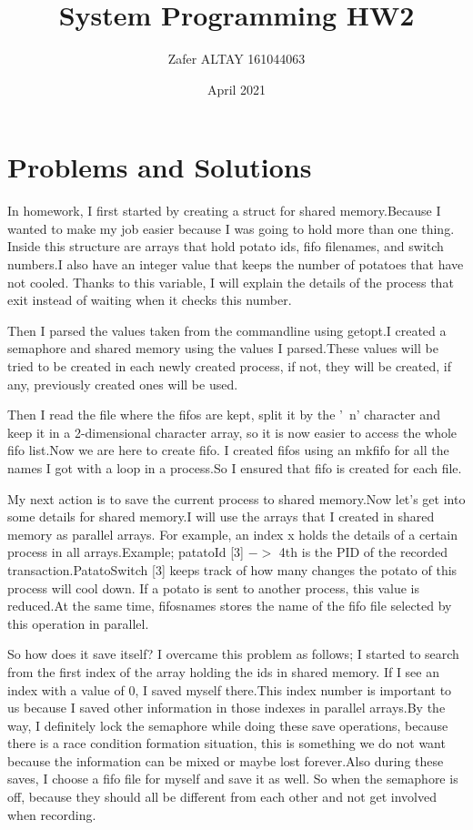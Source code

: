 \documentclass{article}
\title{System Programming HW2}
\author{Zafer ALTAY 161044063 }
\date{April 2021}
\begin{document}
\maketitle

\section{Problems and Solutions}
In homework, I first started by creating a struct for shared memory.Because I wanted to make my job easier because I was going to hold more than one thing. Inside this structure are arrays that hold potato ids, fifo filenames, and switch numbers.I also have an integer value that keeps the number of potatoes that have not cooled. Thanks to this variable, I will explain the details of the process that exit instead of waiting when it checks this number.

Then I parsed the values taken from the commandline using getopt.I created a semaphore and shared memory using the values I parsed.These values will be tried to be created in each newly created process, if not, they will be created, if any, previously created ones will be used.

Then I read the file where the fifos are kept, split it by the '\ n' character and keep it in a 2-dimensional character array, so it is now easier to access the whole fifo list.Now we are here to create fifo. I created fifos using an mkfifo for all the names I got with a loop in a process.So I ensured that fifo is created for each file.

My next action is to save the current process to shared memory.Now let's get into some details for shared memory.I will use the arrays that I created in shared memory as parallel arrays. For example, an index x holds the details of a certain process in all arrays.Example; patatoId [3] $->$ 4th is the PID of the recorded transaction.PatatoSwitch [3] keeps track of how many changes the potato of this process will cool down. If a potato is sent to another process, this value is reduced.At the same time, fifosnames stores the name of the fifo file selected by this operation in parallel. 

So how does it save itself? I overcame this problem as follows; I started to search from the first index of the array holding the ids in shared memory. If I see an index with a value of 0, I saved myself there.This index number is important to us because I saved other information in those indexes in parallel arrays.By the way, I definitely lock the semaphore while doing these save operations, because there is a race condition formation situation, this is something we do not want because the information can be mixed or maybe lost forever.Also during these saves, I choose a fifo file for myself and save it as well. So when the semaphore is off, because they should all be different from each other and not get involved when recording.
\end{document}
